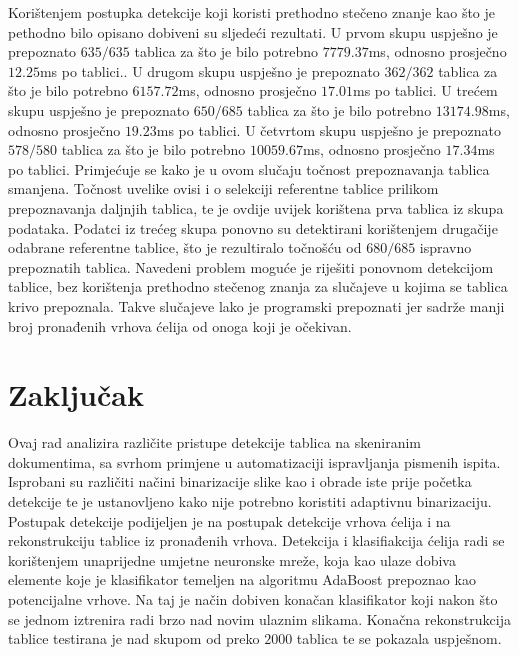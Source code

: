 \documentclass[times, utf8, zavrsni, numeric]{fer}
\begin{document}
Korištenjem postupka detekcije koji koristi prethodno stečeno znanje kao što je pethodno bilo opisano dobiveni su sljedeći rezultati.
U prvom skupu uspješno je prepoznato $635/635$ tablica za što je bilo potrebno $7779.37$ms, odnosno prosječno $12.25$ms po tablici..
U drugom skupu uspješno je prepoznato $362/362$ tablica za što je bilo potrebno $6157.72$ms, odnosno prosječno $17.01$ms po tablici.
U trećem skupu uspješno je prepoznato $650/685$ tablica za što je bilo potrebno $13174.98$ms, odnosno prosječno $19.23$ms po tablici.
U četvrtom skupu uspješno je prepoznato $578/580$ tablica za što je bilo potrebno $10059.67$ms, odnosno prosječno $17.34$ms po tablici.
Primjećuje se kako je u ovom slučaju točnost prepoznavanja tablica smanjena.
Točnost uvelike ovisi i o selekciji referentne tablice prilikom prepoznavanja daljnjih tablica, te je ovdije uvijek korištena prva tablica iz skupa podataka.
Podatci iz trećeg skupa ponovno su detektirani korištenjem drugačije odabrane referentne tablice, što je rezultiralo točnošću od $680/685$ ispravno prepoznatih tablica.
Navedeni problem moguće je riješiti ponovnom detekcijom tablice, bez korištenja prethodno stečenog znanja za slučajeve u kojima se tablica krivo prepoznala.
Takve slučajeve lako je programski prepoznati jer sadrže manji broj pronađenih vrhova ćelija od onoga koji je očekivan.\\


\chapter{Zaključak}
Ovaj rad analizira različite pristupe detekcije tablica na skeniranim dokumentima, sa svrhom primjene u automatizaciji ispravljanja pismenih ispita.
Isprobani su različiti načini binarizacije slike kao i obrade iste prije početka detekcije te je ustanovljeno kako nije potrebno koristiti adaptivnu binarizaciju.
Postupak detekcije podijeljen je na postupak detekcije vrhova ćelija i na rekonstrukciju tablice iz pronađenih vrhova.
Detekcija i klasifiakcija ćelija radi se korištenjem unaprijedne umjetne neuronske mreže, koja kao ulaze dobiva elemente koje je klasifikator temeljen na algoritmu AdaBoost prepoznao kao potencijalne vrhove.
Na taj je način dobiven konačan klasifikator koji nakon što se jednom iztrenira radi brzo nad novim ulaznim slikama.
Konačna rekonstrukcija tablice testirana je nad skupom od preko $2000$ tablica te se pokazala uspješnom.





\end{document}
